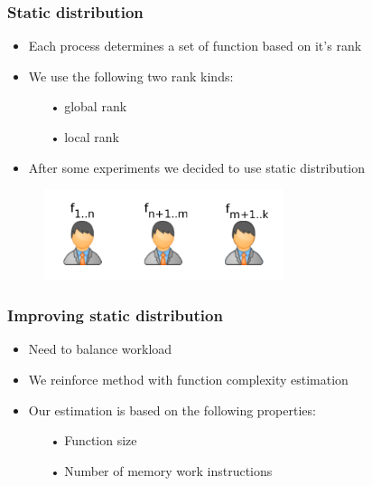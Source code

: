 \begin{frame}
\frametitle{Static distribution}
\begin{itemize}
\item Each process determines a set of function based on it's rank
\item We use the following two rank kinds:
	\begin{itemize}
		\item[•] global rank
		\item[•] local rank 
	\end{itemize}
\item After some experiments we decided to use static distribution
\end{itemize}
	\begin{figure}
		\includegraphics[width=70mm]{image/statDistr.png}
	\end{figure}	
\end{frame}


\begin{frame}
\frametitle{Improving static distribution}
\begin{itemize}
\item Need to balance workload
\item We reinforce method with function complexity estimation
\item Our estimation is based on the following properties:
	\begin{itemize}
		\item[•] Function size
		\item[•] Number of memory work instructions
	\end{itemize}
\end{itemize}
\end{frame}


